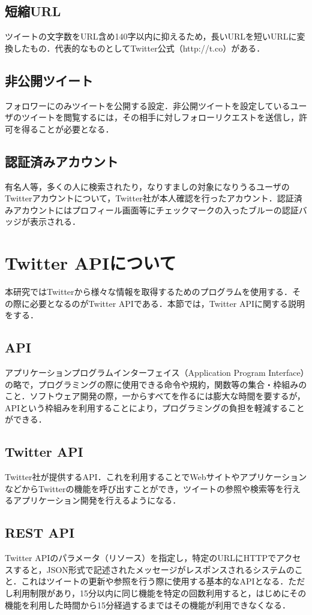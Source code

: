 \subsection{短縮URL}
ツイートの文字数をURL含め140字以内に抑えるため，長いURLを短いURLに変換したもの．代表的なものとしてTwitter公式（http://t.co）がある．

\subsection{非公開ツイート}
フォロワーにのみツイートを公開する設定．非公開ツイートを設定しているユーザのツイートを閲覧するには，その相手に対しフォローリクエストを送信し，許可を得ることが必要となる．

\subsection{認証済みアカウント}
有名人等，多くの人に検索されたり，なりすましの対象になりうるユーザのTwitterアカウントについて，Twitter社が本人確認を行ったアカウント．認証済みアカウントにはプロフィール画面等にチェックマークの入ったブルーの認証バッジが表示される．

\section{Twitter APIについて}
本研究ではTwitterから様々な情報を取得するためのプログラムを使用する．その際に必要となるのがTwitter APIである．本節では，Twitter APIに関する説明をする．

\subsection{API}
アプリケーションプログラムインターフェイス（Application Program Interface）の略で，プログラミングの際に使用できる命令や規約，関数等の集合・枠組みのこと．ソフトウェア開発の際，一からすべてを作るには膨大な時間を要するが，APIという枠組みを利用することにより，プログラミングの負担を軽減することができる\cite{whatsapi}．

\subsection{Twitter API}
Twitter社が提供するAPI．これを利用することでWebサイトやアプリケーションなどからTwitterの機能を呼び出すことができ，ツイートの参照や検索等を行えるアプリケーション開発を行えるようになる\cite{whatstwitterapi}．

\subsection{REST API}
Twitter APIのパラメータ（リソース）を指定し，特定のURLにHTTPでアクセスすると，JSON形式で記述されたメッセージがレスポンスされるシステムのこと．これはツイートの更新や参照を行う際に使用する基本的なAPIとなる．ただし利用制限があり，15分以内に同じ機能を特定の回数利用すると，はじめにその機能を利用した時間から15分経過するまではその機能が利用できなくなる．

